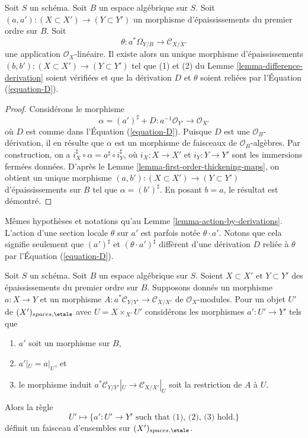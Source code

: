 \begin{lemma}
\label{lemma-action-by-derivations}
Soit $S$ un schéma. Soit $B$ un espace algébrique sur $S$.
Soit $(a, a') : (X \subset X') \to (Y \subset Y')$
un morphisme d'épaississements du premier ordre sur $B$.
Soit
$$
\theta : a^*\Omega_{Y/B} \to \mathcal{C}_{X/X'}
$$
une application $\mathcal{O}_X$-linéaire. Il existe alors un unique morphisme d'épaississements
$(b, b') : (X \subset X') \to (Y \subset Y')$ tel que
(1) et (2) du
Lemme \ref{lemma-difference-derivation}
soient vérifiées et que la dérivation $D$ et $\theta$ soient reliées par
l'Équation (\ref{equation-D}).
\end{lemma}

\begin{proof}
Considérons le morphisme
$$
\alpha = (a')^\sharp + D : a^{-1}\mathcal{O}_{Y'} \to \mathcal{O}_{X'}
$$
où $D$ est comme dans l'Équation (\ref{equation-D}). Puisque $D$ est une
$\mathcal{O}_B$-dérivation, il en résulte que $\alpha$ est un morphisme de
faisceaux de $\mathcal{O}_B$-algèbres. Par construction, on a
$i_X^\sharp \circ \alpha = a^\sharp \circ i_Y^\sharp$, où
$i_X : X \to X'$ et $i_Y : Y \to Y'$ sont les immersions fermées données. D'après le
Lemme \ref{lemma-first-order-thickening-maps},
on obtient un unique morphisme
$(a, b') : (X  \subset X') \to (Y \subset Y')$ d'épaississements
sur $B$ tel que $\alpha = (b')^\sharp$. En posant $b = a$,
le résultat est démontré.
\end{proof}

\begin{remark}
\label{remark-action-by-derivations}
Mêmes hypothèses et notations qu'au Lemme \ref{lemma-action-by-derivations}.
L'action d'une section locale $\theta$ sur $a'$ est parfois notée
$\theta \cdot a'$. Notons que cela signifie seulement que
$(a')^\sharp$ et $(\theta \cdot a')^\sharp$ diffèrent d'une dérivation
$D$ reliée à $\theta$ par l'Équation (\ref{equation-D}).
\end{remark}

\begin{lemma}
\label{lemma-sheaf}
Soit $S$ un schéma. Soit $B$ un espace algébrique sur $S$.
Soient $X \subset X'$ et $Y \subset Y'$ des épaississements du premier ordre
sur $B$. Supposons donnés un morphisme $a : X \to Y$ et un morphisme
$A : a^*\mathcal{C}_{Y/Y'} \to \mathcal{C}_{X/X'}$ de
$\mathcal{O}_X$-modules. Pour un objet $U'$ de
$(X')_{spaces, \etale}$ avec $U = X \times_{X'} U'$
considérons les morphismes $a' : U' \to Y'$ tels que
\begin{enumerate}
\item $a'$ soit un morphisme sur $B$,
\item $a'|_U = a|_U$, et
\item le morphisme induit
$a^*\mathcal{C}_{Y/Y'}|_U \to \mathcal{C}_{X/X'}|_U$
soit la restriction de $A$ à $U$.
\end{enumerate}
Alors la règle
\begin{equation}
\label{equation-sheaf}
U' \mapsto
\{a' : U' \to Y'\text{ such that (1), (2), (3) hold.}\}
\end{equation}
définit un faisceau d'ensembles sur $(X')_{spaces, \etale}$.
\end{lemma}

